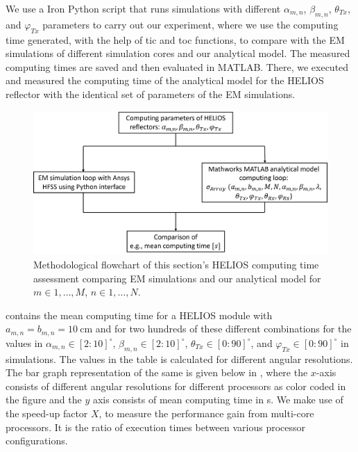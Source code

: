 We use a Iron Python script that runs simulations with different $\alpha_{m,n}$,  $\beta_{m,n}$, $\theta_{Tx}$, and $\varphi_{Tx}$ parameters to carry out our experiment, where we use the computing time generated, with the help of tic and toc functions, to compare with the EM simulations of different simulation cores and our analytical model. The measured computing times are saved and then evaluated in MATLAB. There, we executed and measured the computing time of the analytical model for the HELIOS reflector with the identical set of parameters of the EM simulations.
\begin{figure}[H]
	\centering
	\includegraphics[width=1\linewidth]{images/Section 4 Images/flowchart_computingtime}
	\caption{Methodological flowchart of this section's HELIOS computing time assessment comparing EM simulations and our analytical model for $m\in1,\dots,M$, $n\in1,\dots,N$.}
	\label{fig:flowchart_computingtime}
\end{figure}
 contains the mean computing time for a HELIOS module with $a_{m,n}=b_{m,n}=\SI{10}{\centi\meter}$ and for two hundreds of these different combinations for the values in $\alpha_{m,n} \in [2:10]^\circ$, $\beta_{m,n} \in [2:10]^\circ$, $\theta_{Tx} \in [0:90]^\circ$, and $\varphi_{Tx} \in [0:90]^\circ$ in simulations. The values in the table is calculated for different angular resolutions. The bar graph representation of the same is given below in , where the $x$-axis consists of different angular resolutions for different processors as color coded in the figure and the $y$ axis consists of mean computing time in \si{\second}. We make use of the speed-up factor $X$, to measure the performance gain from multi-core processors. It is the ratio of execution times between various processor configurations.

